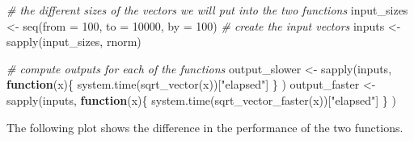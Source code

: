 \documentclass[
  12pt,
]{style/krantz}
\newenvironment{Shaded}{\begin{snugshade}}{\end{snugshade}}
\newcommand{\AttributeTok}[1]{\textcolor[rgb]{0.77,0.63,0.00}{#1}}
\newcommand{\CommentTok}[1]{\textcolor[rgb]{0.56,0.35,0.01}{\textit{#1}}}
\newcommand{\ControlFlowTok}[1]{\textcolor[rgb]{0.13,0.29,0.53}{\textbf{#1}}}
\newcommand{\DecValTok}[1]{\textcolor[rgb]{0.00,0.00,0.81}{#1}}
\newcommand{\FunctionTok}[1]{\textcolor[rgb]{0.00,0.00,0.00}{#1}}
\newcommand{\NormalTok}[1]{#1}
\newcommand{\OtherTok}[1]{\textcolor[rgb]{0.56,0.35,0.01}{#1}}
\newcommand{\StringTok}[1]{\textcolor[rgb]{0.31,0.60,0.02}{#1}}
\begin{document}
\begin{Shaded}
\begin{Highlighting}[]
\CommentTok{\# the different sizes of the vectors we will put into the two functions}
\NormalTok{input\_sizes }\OtherTok{\textless{}{-}} \FunctionTok{seq}\NormalTok{(}\AttributeTok{from =} \DecValTok{100}\NormalTok{, }\AttributeTok{to =} \DecValTok{10000}\NormalTok{, }\AttributeTok{by =} \DecValTok{100}\NormalTok{)}
\CommentTok{\# create the input vectors}
\NormalTok{inputs }\OtherTok{\textless{}{-}} \FunctionTok{sapply}\NormalTok{(input\_sizes, rnorm)}

\CommentTok{\# compute outputs for each of the functions}
\NormalTok{output\_slower }\OtherTok{\textless{}{-}} 
     \FunctionTok{sapply}\NormalTok{(inputs, }
            \ControlFlowTok{function}\NormalTok{(x)\{ }\FunctionTok{system.time}\NormalTok{(}\FunctionTok{sqrt\_vector}\NormalTok{(x))[}\StringTok{"elapsed"}\NormalTok{]}
\NormalTok{                 \}}
\NormalTok{            )}
\NormalTok{output\_faster }\OtherTok{\textless{}{-}} 
     \FunctionTok{sapply}\NormalTok{(inputs, }
            \ControlFlowTok{function}\NormalTok{(x)\{ }\FunctionTok{system.time}\NormalTok{(}\FunctionTok{sqrt\_vector\_faster}\NormalTok{(x))[}\StringTok{"elapsed"}\NormalTok{]}
\NormalTok{                 \}}
\NormalTok{            )}
\end{Highlighting}
\end{Shaded}

The following plot shows the difference in the performance of the two functions.
\end{document}
